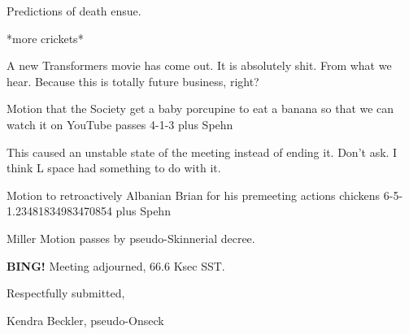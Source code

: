 \documentclass[10pt]{article}
\newcommand{\bing}{{\bf BING!} }
\newcommand{\ps}{ plus Spehn\xspace}
\begin{document}
Predictions of death ensue.

*more crickets*

A new Transformers movie has come out.  It is absolutely shit.  From what we hear.  Because this is totally future business, right?

Motion that the Society get a baby porcupine to eat a banana so that we can watch it on YouTube passes 4-1-3 \ps

This caused an unstable state of the meeting instead of ending it.  Don't ask.  I think L space had something to do with it.

Motion to retroactively Albanian Brian for his premeeting actions chickens 6-5-1.23481834983470854 \ps

Miller Motion passes by pseudo-Skinnerial decree.

\bing
\noindent
Meeting adjourned, 66.6 Ksec SST.

\vspace{18pt}

\centerline{Respectfully submitted,}
\centerline{Kendra Beckler, pseudo-Onseck}
\end{document}
